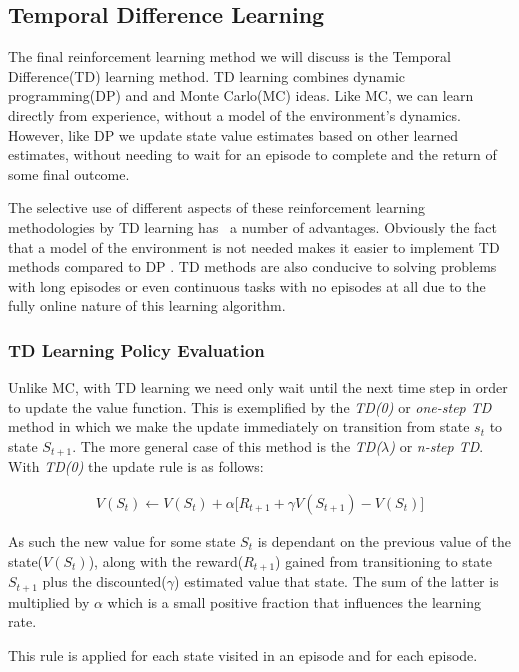 \subsection{Temporal Difference Learning}\label{subsec:td}
The final reinforcement learning method we will discuss is the Temporal Difference(TD) learning method.
TD learning combines dynamic programming(DP) and and Monte Carlo(MC) ideas\citep{sutton1998reinforcement}.
Like MC, we can learn directly from experience, without a model of the environment's dynamics.
However, like DP we update state value estimates based on other learned estimates, without needing to wait for an
episode to complete and the return of some final outcome.

The selective use of different aspects of these reinforcement learning methodologies by TD learning has \
a number of advantages.
Obviously the fact that a model of the environment is not needed makes it easier to implement TD methods
compared to DP .
TD methods are also conducive to solving problems with long episodes or even continuous tasks with no
episodes at all due to the fully online nature of this learning algorithm.

\subsubsection{TD Learning Policy Evaluation}
Unlike MC, with TD learning we need only wait until the next time step in order to update the value function.
This is exemplified by the \textit{TD(0)} or \textit{one-step TD} method in which we make the
update immediately on transition from state $s_t$ to state $S_{t+1}$.
The more general case of this method is the \textit{TD($\lambda$)} or \textit{n-step TD}.
With \textit{TD(0)} the update rule is as follows:

\begin{align}
    V(S_t) \leftarrow V(S_t) + \alpha \lbrack R_{t+1} + \gamma V(S_{t+1}) - V(S_t) \rbrack
\end{align}

As such the new value for some state $S_t$ is dependant on the previous value of the state($V(S_t)$),
along with the reward($R_{t+1}$) gained from transitioning to state $S_{t+1}$ plus the discounted($\gamma$)
estimated value that state.
The sum of the latter is multiplied by $\alpha$ which is a small positive fraction that influences the
learning rate.

This rule is applied for each state visited in an episode and for each episode.


